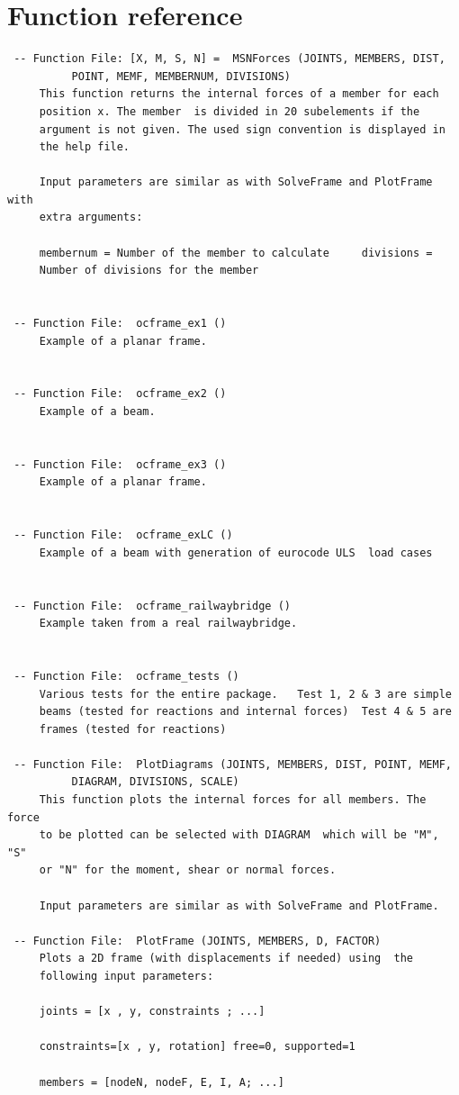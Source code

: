 \documentclass[a4paper]{article}
\begin{document}
\section{Function reference}
		\begin{verbatim}
 -- Function File: [X, M, S, N] =  MSNForces (JOINTS, MEMBERS, DIST,
          POINT, MEMF, MEMBERNUM, DIVISIONS)
     This function returns the internal forces of a member for each
     position x. The member  is divided in 20 subelements if the
     argument is not given. The used sign convention is displayed in
     the help file.

     Input parameters are similar as with SolveFrame and PlotFrame with
     extra arguments:

     membernum = Number of the member to calculate     divisions =
     Number of divisions for the member


 -- Function File:  ocframe_ex1 ()
     Example of a planar frame.


 -- Function File:  ocframe_ex2 ()
     Example of a beam.


 -- Function File:  ocframe_ex3 ()
     Example of a planar frame.


 -- Function File:  ocframe_exLC ()
     Example of a beam with generation of eurocode ULS  load cases


 -- Function File:  ocframe_railwaybridge ()
     Example taken from a real railwaybridge.


 -- Function File:  ocframe_tests ()
     Various tests for the entire package.   Test 1, 2 & 3 are simple
     beams (tested for reactions and internal forces)  Test 4 & 5 are
     frames (tested for reactions)

 -- Function File:  PlotDiagrams (JOINTS, MEMBERS, DIST, POINT, MEMF,
          DIAGRAM, DIVISIONS, SCALE)
     This function plots the internal forces for all members. The force
     to be plotted can be selected with DIAGRAM  which will be "M", "S"
     or "N" for the moment, shear or normal forces.

     Input parameters are similar as with SolveFrame and PlotFrame.

 -- Function File:  PlotFrame (JOINTS, MEMBERS, D, FACTOR)
     Plots a 2D frame (with displacements if needed) using  the
     following input parameters:

     joints = [x , y, constraints ; ...]

     constraints=[x , y, rotation] free=0, supported=1

     members = [nodeN, nodeF, E, I, A; ...]


\end{verbatim}
\end{document}
